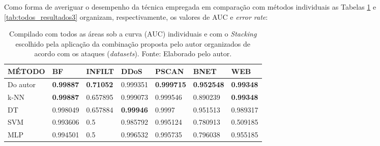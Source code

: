Como forma de averiguar o desempenho da técnica empregada em comparação com métodos individuais as Tabelas \ref{tab:todos_resultados2} e \ref{tab:todos_resultados3} organizam, respectivamente, os valores de AUC e \textit{error rate}:





\begin{longtable}{l|l|l|l|l|l|l}

\caption{Compilado com todos as áreas sob a curva (AUC) individuais e com o
\textit{Stacking} escolhido pela aplicação da combinação proposta pelo autor organizados de acordo com os ataques (\textit{datasets}). Fonte: Elaborado pelo autor.}

\label{tab:todos_resultados2}

\hline


\textbf{MÉTODO} & \textbf{BF} & \textbf{INFILT} & \textbf{DDoS} & \textbf{PSCAN}  & \textbf{BNET} & \textbf{WEB} \\ \hline \hline

Do autor & \textbf{0.99887}        & \textbf{0.71052} & 0.999351          & \textbf{0.999715} & \textbf{0.952548} & \textbf{0.99348} \\ \hline

k-NN              & \textbf{0.99887}        & 0.657895          & 0.999073          & 0.999546 & 0.890239 & \textbf{0.99348} \\ \hline
DT                & 0.998049                 & 0.657884          & \textbf{0.99946} & 0.9997   & 0.951513 & 0.989317 \\ \hline
SVM               & 0.993606                 & 0.5               & 0.985792          & 0.995124 & 0.780913 & 0.509185 \\ \hline
MLP               & 0.994501                 & 0.5               & 0.996532          & 0.995735 & 0.796038 & 0.955185 \\ \hline


\end{longtable}












































